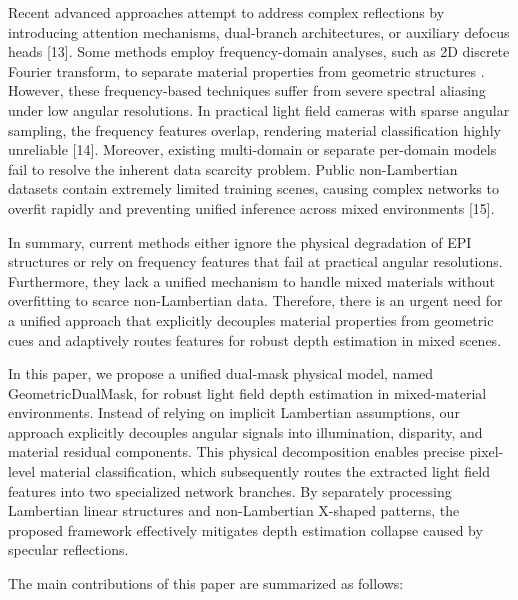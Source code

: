 Recent advanced approaches attempt to address complex reflections by introducing attention mechanisms, dual-branch architectures, or auxiliary defocus heads [13]. Some methods employ frequency-domain analyses, such as 2D discrete Fourier transform, to separate material properties from geometric structures . However, these frequency-based techniques suffer from severe spectral aliasing under low angular resolutions. In practical light field cameras with sparse angular sampling, the frequency features overlap, rendering material classification highly unreliable [14]. Moreover, existing multi-domain or separate per-domain models fail to resolve the inherent data scarcity problem. Public non-Lambertian datasets contain extremely limited training scenes, causing complex networks to overfit rapidly and preventing unified inference across mixed environments [15].

In summary, current methods either ignore the physical degradation of EPI structures or rely on frequency features that fail at practical angular resolutions. Furthermore, they lack a unified mechanism to handle mixed materials without overfitting to scarce non-Lambertian data. Therefore, there is an urgent need for a unified approach that explicitly decouples material properties from geometric cues and adaptively routes features for robust depth estimation in mixed scenes.

In this paper, we propose a unified dual-mask physical model, named GeometricDualMask, for robust light field depth estimation in mixed-material environments. Instead of relying on implicit Lambertian assumptions, our approach explicitly decouples angular signals into illumination, disparity, and material residual components. This physical decomposition enables precise pixel-level material classification, which subsequently routes the extracted light field features into two specialized network branches. By separately processing Lambertian linear structures and non-Lambertian X-shaped patterns, the proposed framework effectively mitigates depth estimation collapse caused by specular reflections.

The main contributions of this paper are summarized as follows:

